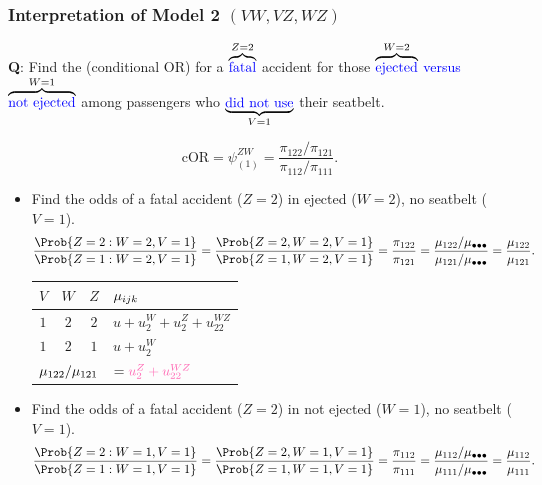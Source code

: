 \documentclass[oneside]{book}\usepackage[]{graphicx}\usepackage[svgnames]{xcolor}
\providecommand\given{} %
\renewcommand\given{\nonscript\:\delimsize\vert\nonscript\:\mathopen{}}%
\renewcommand\given{\nonscript\:\delimsize\vert\nonscript\:\mathopen{}}%
\renewcommand\given{\nonscript\:\delimsize\vert\nonscript\:\mathopen{}}%
\renewcommand\given{\nonscript\:\delimsize\vert\nonscript\:\mathopen{}}%
\renewcommand\given{\nonscript\:\delimsize\vert\nonscript\:\mathopen{}}%
\renewcommand\given{\nonscript\:\delimsize\vert\nonscript\:\mathopen{}}%
\renewcommand\given{\nonscript\:\delimsize\vert\nonscript\:\mathopen{}}%
\renewcommand\given{\nonscript\:\delimsize\vert\nonscript\:\mathopen{}}%
\renewcommand\given{\nonscript\:\delimsize\vert\nonscript\:\mathopen{}}%
\renewcommand\given{\nonscript\:\delimsize\vert\nonscript\:\mathopen{}}%
\renewcommand\given{\nonscript\:\delimsize\vert\nonscript\:\mathopen{}}%
\renewcommand\given{\nonscript\:\delimsize\vert\nonscript\:\mathopen{}}%
\let\log\relax%
\newcommand{\cOR}{\text{cOR}}%
\renewcommand\given{:}
\begin{document}
\subsubsection*{Interpretation of Model 2 $(VW , VZ , WZ )$}
\begin{Example}{}
    \textbf{Q}: Find the (conditional OR) for a $ \overbrace{\text{\textcolor{Blue}{fatal}}}^{Z=2} $ accident for those
    $ \overbrace{\text{\textcolor{Blue}{ejected}}}^{W=2} $ \textcolor{Blue}{versus} $ \overbrace{\text{\textcolor{Blue}{not ejected}}}^{W=1} $
    among passengers who $ \underbrace{\text{\textcolor{Blue}{did not use}}}_{V=1} $ their seatbelt.
\end{Example}
\[ \cOR=\psi_{(1)}^{ZW}=\frac{\pi_{122}/\pi_{121}}{\pi_{112}/\pi_{111}}. \]
\begin{itemize}
    \item Find the odds of a fatal accident ($Z = 2$) in ejected ($W = 2$), no seatbelt ($V = 1$).
          \[ \frac{\Prob{Z=2\given W=2,V=1}}{\Prob{Z=1\given W=2,V=1}}=\frac{\Prob{Z=2,W=2,V=1}}{\Prob{Z=1,W=2,V=1}}=\frac{\pi_{122}}{\pi_{121}}
              =\frac{\mu_{122}/\mu_{\bullet\bullet\bullet}}{\mu_{121}/\mu_{\bullet\bullet\bullet}}=\frac{\mu_{122}}{\mu_{121}}. \]
          \begin{table}[H]
              \centering
              \begin{tabular}{cccl}
                  $ V $                                           & $ W $                                     & $ Z $ & $ \log{\mu_{ijk}} $           \\
                  \midrule
                  $1$                                             & $2$                                       & $2$   & $ u+u_2^W+u_2^Z+u_{22}^{WZ} $ \\
                  $1$                                             & $2$                                       & $1$   & $ u+u_2^W $                   \\
                  \midrule
                  \multicolumn{3}{c}{$\log{\mu_{122}/\mu_{121}}$} & $=\textcolor{HotPink}{u_2^Z+u_{22}^{WZ}}$
              \end{tabular}
          \end{table}
    \item Find the odds of a fatal accident ($ Z=2 $) in not ejected ($ W=1 $), no seatbelt ($ V=1 $).
          \[ \frac{\Prob{Z=2\given W=1,V=1}}{\Prob{Z=1\given W=1,V=1}}=\frac{\Prob{Z=2,W=1,V=1}}{\Prob{Z=1,W=1,V=1}}=\frac{\pi_{112}}{\pi_{111}}
              =\frac{\mu_{112}/\mu_{\bullet\bullet\bullet}}{\mu_{111}/\mu_{\bullet\bullet\bullet}}=\frac{\mu_{112}}{\mu_{111}}. \]

\end{itemize}
\end{document}
